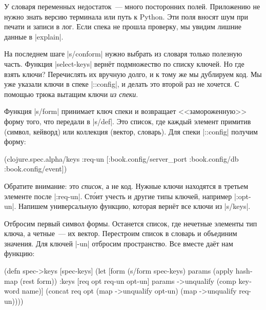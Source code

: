 У словаря переменных недостаток~--- много посторонних полей. Приложению не нужно
знать версию терминала или путь к Python. Эти поля вносят шум при печати и
записи в лог. Если спека не прошла проверку, мы увидим лишние данные в
\spverb|explain|.


На последнем шаге \spverb|s/conform| нужно выбрать из словаря только полезную
часть. Функция \spverb|select-keys| верн\"{е}т подмножество по списку ключей. Но где
взять ключи? Перечислять их вручную долго, и к тому же мы дублируем код. Мы уже
указали ключи в спеке \spverb|::config|, и делать это второй раз не хочется. С
помощью трюка вытащим ключи \emph{из спеки}.

Функция \spverb|s/form| принимает ключ спеки и возвращает <<замороженную>> форму
того, что передали в \spverb|s/def|. Это список, где каждый элемент примитив
(символ, кейворд) или коллекция (вектор, словарь). Для спеки \spverb|::config|
получим форму:

\begin{english}
  \begin{clojure}
(clojure.spec.alpha/keys
 :req-un [:book.config/server_port
          :book.config/db
          :book.config/event])
  \end{clojure}
\end{english}


Обратите внимание: это \emph{список}, а не код. Нужные ключи находятся в третьем
элементе после \spverb|:req-un|. Ст\'{о}ит учесть и другие типы ключей, например
\spverb|:opt-un|. Напишем универсальную функцию, которая верн\"{е}т все ключи из
\spverb|s/keys|.

Отбросим первый символ формы. Останется список, где нечетные элементы тип ключа,
а четные~--- их вектор. Перестроим список в словарь и объединим значения. Для
ключей \spverb|-un| отбросим пространство. Все вместе даёт нам функцию:


\begin{english}
  \begin{clojure}
(defn spec->keys
  [spec-keys]
  (let [form (s/form spec-keys)
        params (apply hash-map (rest form))
        {:keys [req opt req-un opt-un]} params
        ->unqualify (comp keyword name)]
    (concat req
            opt
            (map ->unqualify opt-un)
            (map ->unqualify req-un))))
  \end{clojure}
\end{english}

